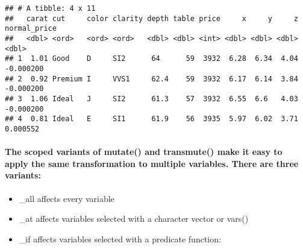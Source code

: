 \documentclass[
]{article}
\newenvironment{Shaded}{\begin{snugshade}}{\end{snugshade}}
\newcommand{\AttributeTok}[1]{\textcolor[rgb]{0.77,0.63,0.00}{#1}}
\newcommand{\CommentTok}[1]{\textcolor[rgb]{0.56,0.35,0.01}{\textit{#1}}}
\newcommand{\ControlFlowTok}[1]{\textcolor[rgb]{0.13,0.29,0.53}{\textbf{#1}}}
\newcommand{\DecValTok}[1]{\textcolor[rgb]{0.00,0.00,0.81}{#1}}
\newcommand{\FunctionTok}[1]{\textcolor[rgb]{0.00,0.00,0.00}{#1}}
\newcommand{\NormalTok}[1]{#1}
\newcommand{\OtherTok}[1]{\textcolor[rgb]{0.56,0.35,0.01}{#1}}
\newcommand{\SpecialCharTok}[1]{\textcolor[rgb]{0.00,0.00,0.00}{#1}}
\newcommand{\StringTok}[1]{\textcolor[rgb]{0.31,0.60,0.02}{#1}}
\begin{document}
\begin{verbatim}
## # A tibble: 4 x 11
##   carat cut     color clarity depth table price     x     y     z normal_price
##   <dbl> <ord>   <ord> <ord>   <dbl> <dbl> <int> <dbl> <dbl> <dbl>        <dbl>
## 1  1.01 Good    D     SI2      64      59  3932  6.28  6.34  4.04    -0.000200
## 2  0.92 Premium I     VVS1     62.4    59  3932  6.17  6.14  3.84    -0.000200
## 3  1.06 Ideal   J     SI2      61.3    57  3932  6.55  6.6   4.03    -0.000200
## 4  0.81 Ideal   E     SI1      61.9    56  3935  5.97  6.02  3.71     0.000552
\end{verbatim}

\hypertarget{the-scoped-variants-of-mutate-and-transmute-make-it-easy-to-apply-the-same-transformation-to-multiple-variables.-there-are-three-variants}{%
\paragraph{The scoped variants of mutate() and transmute() make it easy
to apply the same transformation to multiple variables. There are three
variants:}\label{the-scoped-variants-of-mutate-and-transmute-make-it-easy-to-apply-the-same-transformation-to-multiple-variables.-there-are-three-variants}}

\begin{itemize}
\item
  \_all affects every variable
\item
  \_at affects variables selected with a character vector or vars()
\item
  \_if affects variables selected with a predicate function:
\end{itemize}

\begin{Shaded}
\end{Shaded}
\end{document}
